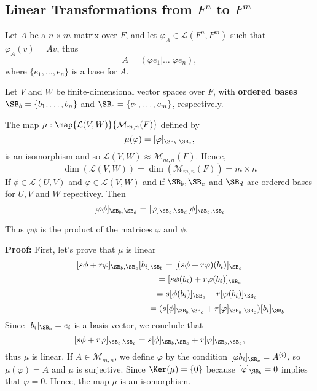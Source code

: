 \documentclass[11pt]{scrartcl}
\newcommand{\CL}{\mathcal L}
\newcommand{\CM}{\mathcal M}
\begin{document}
\begin{definition*}
\begin{definition*}
\section{Linear Transformations from $F^{n}$ to $F^{m}$}
Let $A$ be a $n \times m$ matrix over $F$, and let $\varphi_{A} \in \CL(F^{n}, F^{m})$ such that $\varphi_{A}(v) = Av$, thus
$$
A = (\varphi e_{1} | \dots | \varphi e_{n}),
$$
where $\{e_{1}, \dots, e_{n}\}$ is a base for $A$.
\begin{theorem}
  Let $V$ and $W$ be finite-dimensional vector spaces over $F$, with \textbf{ordered bases} $\SB_{b} = \{b_{1}, \dots, b_{n}\}$ and $\SB_{c} = \{c_{1}, \dots, c_{m}\}$, respectively.
  \begin{enumerate}[1.]
      \ii The map $\mu: \map{\CL(V, W)}{\CM_{m, n}(F)}$ defined by
      $$
      \mu(\varphi) = [\varphi]_{\SB_{b}, \SB_{c}},
      $$ 
      is an isomorphism and so $\CL(V, W) \approx \CM_{m, n}(F)$. Hence,
      $$
      \dim(\CL(V, W)) = \dim(\CM_{m, n}(F)) = m \times n
      $$
      \ii If $\phi \in \CL(U, V)$ and $\varphi \in \CL(V, W)$ and if $\SB_{b}, \SB_{c}$ and $\SB_{d}$ are ordered bases for $U, V$ and $W$ repectivey. Then
      $$
      [\varphi \phi]_{\SB_{b}, \SB_{d}} = [\varphi]_{\SB_{c}, \SB_{d}} [\phi]_{\SB_{b}, \SB_{c}}
      $$
  \end{enumerate}
  Thus $\varphi \phi$ is the product of the matrices $\varphi$ and $\phi$.
\end{theorem}
\textbf{Proof:} First, let's prove that $\mu$ is linear
$$
  [s\phi + r\varphi]_{\SB_{b}, \SB_{c}}[b_{i}]_{\SB_{b}} = [(s\phi + r\varphi)(b_{i})]_{\SB_{c}}
  $$
  $$
  \hspace{9.5em}= [s\phi(b_{i}) + r\varphi(b_{i})]_{\SB_{c}}
  $$
  $$
  \hspace{11em}= s[\phi(b_{i})]_{\SB_{c}} + r[\varphi(b_{i})]_{\SB_{c}}
  $$
  $$
  \hspace{13.5em}= (s[\phi]_{\SB_{b}, \SB_{c}} + r[\varphi]_{\SB_{b}, \SB_{c}})[b_{i}]_{\SB_{b}}
  $$
  Since $[b_{i}]_{\SB_{b}} = e_{i}$ is a basis vector, we conclude that
  $$
  [s\phi + r\varphi]_{\SB_{b}, \SB_{c}} = s[\phi]_{\SB_{b}, \SB_{c}} + r[\varphi]_{\SB_{b}, \SB_{c}},
  $$
  thus $\mu$ is linear. If $A \in \CM_{m, n}$, we define $\varphi$ by the condition $[\varphi b_{i}]_{\SB_{c}} = A^{(i)}$, so $\mu(\varphi) = A$ and $\mu$ is surjective. Since $\Ker(\mu) = \{0\}$ because $[\varphi]_{\SB_{b}} = 0$ implies that $\varphi = 0$. Hence, the map $\mu$ is an isomorphism. \qedsymbol

\end{definition*}
\end{definition*}
\end{document}
